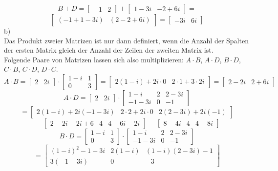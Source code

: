 \documentclass[11pt]{article}
\begin{document}
					$$B+D=\begin{bmatrix}-1&2\end{bmatrix}+\begin{bmatrix}1-3i&-2+6i\end{bmatrix}=$$
					$$\begin{bmatrix}(-1+1-3i)&(2-2+6i)\end{bmatrix}=\begin{bmatrix}-3i&6i\end{bmatrix}$$
				\indent b)\\
					Das Produkt zweier Matrizen ist nur dann definiert, wenn die Anzahl der Spalten der ersten Matrix gleich der Anzahl der Zeilen der zweiten Matrix ist.\\
					Folgende Paare von Matrizen lassen sich also multiplizieren: $A\cdot B$, $A\cdot D$, $B\cdot D$, $C\cdot B$, $C\cdot D$, $D\cdot C$.\\
					$$A\cdot B = \begin{bmatrix}2&2i\end{bmatrix} \cdot \begin{bmatrix}1-i&1\\0&3\end{bmatrix}=\begin{bmatrix}2(1-i)+2i\cdot 0& 2\cdot 1+3\cdot 2i\end{bmatrix}=\begin{bmatrix}2-2i&2+6i\end{bmatrix}$$
					$$A\cdot D=\begin{bmatrix}2&2i\end{bmatrix}\cdot\begin{bmatrix}1-i&2&2-3i\\-1-3i&0&-1\end{bmatrix}$$
					$$=\begin{bmatrix}2(1-i)+2i(-1-3i)&2\cdot 2+2i\cdot 0&2(2-3i)+2i(-1)\end{bmatrix}$$
					$$=\begin{bmatrix}2-2i-2i+6&4&4-6i-2i\end{bmatrix}=\begin{bmatrix}8-4i&4&4-8i\end{bmatrix}$$
					$$B \cdot D=\begin{bmatrix}1-i&1\\0&3\end{bmatrix}\cdot \begin{bmatrix}1-i&2&2-3i\\-1-3i&0&-1\end{bmatrix}$$
					$$=\begin{bmatrix}(1-i)^2-1-3i&2(1-i)&(1-i)(2-3i)-1\\3(-1-3i)&0&-3\end{bmatrix}$$
\end{document}

